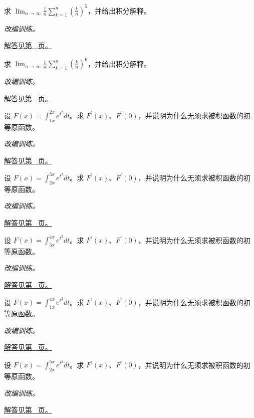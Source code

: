 \documentclass[12pt,fontset=fandol]{ctexart}
\begin{document}
\begin{example}[黎曼和的识别]\label{ex:c17q7}
求 $\displaystyle\lim_{n\to\infty}\frac1n\sum_{k=1}^n\left(\frac kn\right)^{5}$，并给出积分解释。
\par\textit{改编训练。}\par\hyperref[ans:c17q7]{解答见第~\pageref{ans:c17q7} 页。}
\end{example}
\begin{example}[黎曼和的识别]\label{ex:c17q8}
求 $\displaystyle\lim_{n\to\infty}\frac1n\sum_{k=1}^n\left(\frac kn\right)^{6}$，并给出积分解释。
\par\textit{改编训练。}\par\hyperref[ans:c17q8]{解答见第~\pageref{ans:c17q8} 页。}
\end{example}
\begin{example}[两个积分端点都在变化]\label{ex:c17q9}
设 $F(x)=\displaystyle\int_{1x}^{2x}e^{t^2}dt$。求 $F^{\prime}(x)$、$F^{\prime}(0)$，并说明为什么无须求被积函数的初等原函数。
\par\textit{改编训练。}\par\hyperref[ans:c17q9]{解答见第~\pageref{ans:c17q9} 页。}
\end{example}
\begin{example}[两个积分端点都在变化]\label{ex:c17q10}
设 $F(x)=\displaystyle\int_{2x}^{3x}e^{t^2}dt$。求 $F^{\prime}(x)$、$F^{\prime}(0)$，并说明为什么无须求被积函数的初等原函数。
\par\textit{改编训练。}\par\hyperref[ans:c17q10]{解答见第~\pageref{ans:c17q10} 页。}
\end{example}
\begin{example}[两个积分端点都在变化]\label{ex:c17q11}
设 $F(x)=\displaystyle\int_{3x}^{4x}e^{t^2}dt$。求 $F^{\prime}(x)$、$F^{\prime}(0)$，并说明为什么无须求被积函数的初等原函数。
\par\textit{改编训练。}\par\hyperref[ans:c17q11]{解答见第~\pageref{ans:c17q11} 页。}
\end{example}
\begin{example}[两个积分端点都在变化]\label{ex:c17q12}
设 $F(x)=\displaystyle\int_{1x}^{4x}e^{t^2}dt$。求 $F^{\prime}(x)$、$F^{\prime}(0)$，并说明为什么无须求被积函数的初等原函数。
\par\textit{改编训练。}\par\hyperref[ans:c17q12]{解答见第~\pageref{ans:c17q12} 页。}
\end{example}
\begin{example}[两个积分端点都在变化]\label{ex:c17q13}
设 $F(x)=\displaystyle\int_{2x}^{5x}e^{t^2}dt$。求 $F^{\prime}(x)$、$F^{\prime}(0)$，并说明为什么无须求被积函数的初等原函数。
\par\textit{改编训练。}\par\hyperref[ans:c17q13]{解答见第~\pageref{ans:c17q13} 页。}
\end{example}
\end{document}

